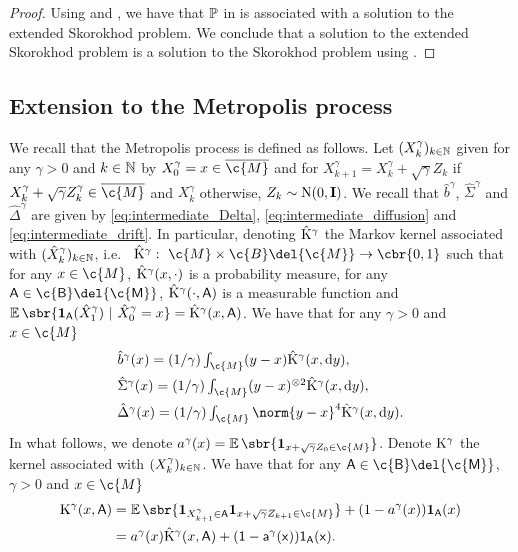 \begin{proof}
	Using  and \cite[Theorem 1, Proposition 2.12]{kang2017submartingale}, we have that $\bb{P}$ in is associated with a solution to the extended Skorokhod problem.
	We conclude that a solution to the extended Skorokhod problem is a solution to the Skorokhod problem using \cite[Corollary 2.10]{ramanan2006reflected}.
\end{proof}

\subsection{Extension to the Metropolis process}
\label{sec:extens-lazy-proc}

We recall that the Metropolis process is defined as follows.
Let $(X_k^\gamma)_{k \in \mathbb{N}}$ given for any $\gamma >0$ and $k \in \mathbb{N}$ by $X_0^\gamma = x \in \cl{\c{M}}$ and for $X_{k+1}^\gamma = X_k^\gamma + \sqrt{\gamma} Z_k$ if $X_k^\gamma + \sqrt{\gamma} Z_k^\gamma \in \cl{\c{M}}$ and $X_k^\gamma$ otherwise, $Z_k \sim \mathrm{N}(0, \m{I})$.
We recall that $\hat{b}^\gamma$, $\hat{\Sigma}^\gamma$ and $\hat{\Delta}^\gamma$ are given by \eqref{eq:intermediate_Delta}, \eqref{eq:intermediate_diffusion} and \eqref{eq:intermediate_drift}.
In particular, denoting $\hat{\mathrm{K}}^\gamma$ the Markov kernel associated with $(\hat{X}_k^\gamma)_{k \in \mathbb{N}}$, i.e.~ $\hat{\Kker}^\gamma: \ \c{M} \times \c{B}\del{\c{M}} \to \cbr{0,1}$ such that for any $x \in \c{M}$, $\hat{\mathrm{K}}^\gamma(x, \cdot)$ is a probability measure, for any $\sf{A} \in \c{B}\del{\c{M}}$, $\hat{\mathrm{K}}^\gamma(\cdot, \sf{A})$ is a measurable function and $\E\sbr{\bm{1}_{\sf{A}}(\hat{X}_1^\gamma) \ | \ \hat{X}_0^\gamma=x} = \hat{\Kker}^\gamma(x, \sf{A})$.
We have that for any $\gamma > 0$ and $x \in \c{M}$ \begin{align}  & \textstyle \hat{b}^\gamma(x) = (1/\gamma) \int_{\c{M}} (y - x) \hat{\Kker}^\gamma(x, \mathrm{d} y) , \\ &\textstyle \hat{\Sigma}^\gamma(x) = (1/\gamma)\int_{\c{M}} (y - x)^{\otimes 2} \hat{\Kker}^\gamma(x, \mathrm{d} y) , \\ &\textstyle \hat{\Delta}^\gamma(x) = (1/\gamma)\int_{\c{M}} \norm{y - x}^4 \hat{\Kker}^\gamma(x, \mathrm{d} y) .
\end{align}
In what follows, we denote $a^\gamma(x) = \E\sbr{\bm{1}_{x + \sqrt{\gamma} Z_0 \in \c{M}}}$.
Denote $\mathrm{K}^\gamma$ the kernel associated with $(X_k^\gamma)_{k \in \mathbb{N}}$.
We have that for any $\sf{A} \in \c{B}\del{\c{M}}$, $\gamma >0$ and $x \in \c{M}$ \begin{align} \Kker^\gamma(x,\sf{A}) & = \E\sbr{\bm{1}_{X_{k+1}^\gamma \in \sf{A}} \bm{1}_{x + \sqrt{\gamma} Z_{k+1} \in \c{M}}} + (1-a^\gamma(x)) \bm{1}_{\sf{A}}(x) \\  & = a^\gamma(x) \hat{\Kker}^\gamma(x, \sf{A}) + (1-a^\gamma(x)) \bm{1}_{\sf{A}}(x) .
                 \label{eq:new_kernel}
\end{align}
